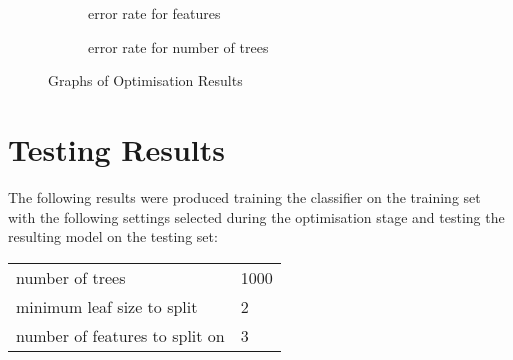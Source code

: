 	\begin{figure}[H]
		\begin{subfigure}{.47\linewidth}\centering
			\caption{error rate for features}
			\label{fig:outOfBagErrorFeaturesGraph}
		\end{subfigure}%
		\hfill
		\begin{subfigure}{.47\linewidth}\centering
			\caption{error rate for number of trees}
			\label{fig:outOfBagErrorTreesGraph}
		\end{subfigure}
		\hfill
		\caption{Graphs of Optimisation Results}
    		\label{fig:optimisationResultsGraphs}	
	\end{figure}
				
	\section{Testing Results}
		The following results were produced training the classifier on the training set with the following settings selected during the optimisation stage and testing the resulting model on the testing set:
		
	\begin{table}[h]
		\begin{tabular}{ll}
			{number of trees} 				& 1000\\
			{minimum leaf size to split}		& 2\\
			{number of features to split on}	& 3\\
		\end{tabular}
	\end{table}
		
